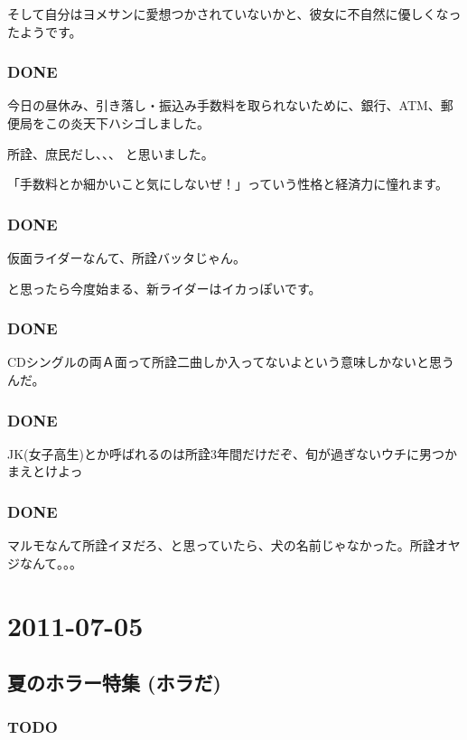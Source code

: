 \documentclass[11pt]{article}
\begin{document}
そして自分はヨメサンに愛想つかされていないかと、彼女に不自然に優しくなったようです。
\subsubsection{\textbf{DONE}}
\label{sec-97_1_3}

今日の昼休み、引き落し・振込み手数料を取られないために、銀行、ATM、郵便局をこの炎天下ハシゴしました。

所詮、庶民だし、、、 と思いました。

「手数料とか細かいこと気にしないぜ！」っていう性格と経済力に憧れます。
\subsubsection{\textbf{DONE}}
\label{sec-97_1_4}

仮面ライダーなんて、所詮バッタじゃん。

と思ったら今度始まる、新ライダーはイカっぽいです。
\subsubsection{\textbf{DONE}}
\label{sec-97_1_5}

CDシングルの両Ａ面って所詮二曲しか入ってないよという意味しかないと思うんだ。
\subsubsection{\textbf{DONE}}
\label{sec-97_1_6}

JK(女子高生)とか呼ばれるのは所詮3年間だけだぞ、旬が過ぎないウチに男つかまえとけよっ
\subsubsection{\textbf{DONE}}
\label{sec-97_1_7}

マルモなんて所詮イヌだろ、と思っていたら、犬の名前じゃなかった。所詮オヤジなんて。。。
\section{2011-07-05}
\label{sec-98}
\subsection{夏のホラー特集 (ホラだ)}
\label{sec-98_1}
\subsubsection{\textbf{TODO}}
\label{sec-98_1_1}
\end{document}
